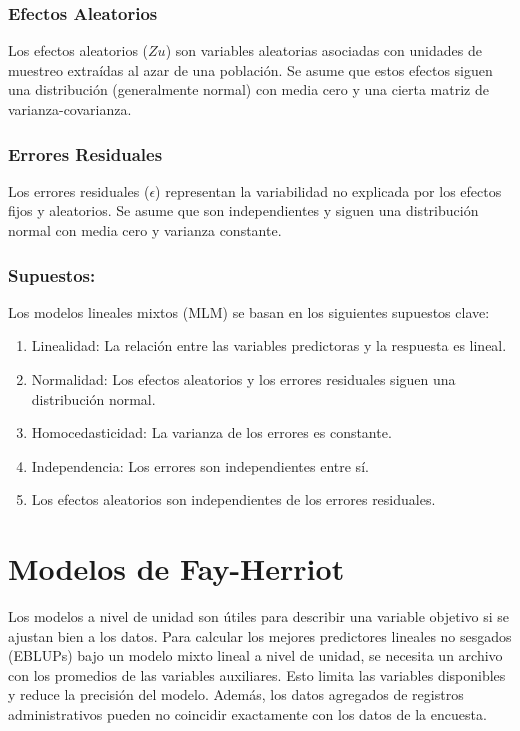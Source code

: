 \documentclass[12pt,spanish]{article}
\begin{document}
\subsubsection*{Efectos Aleatorios}

Los efectos aleatorios ($Zu$) son variables aleatorias asociadas con unidades de muestreo extraídas al azar de una población. Se asume que estos efectos siguen una distribución (generalmente normal) con media cero y una cierta matriz de varianza-covarianza.

\subsubsection*{Errores Residuales}

Los errores residuales ($\epsilon$) representan la variabilidad no explicada por los efectos fijos y aleatorios. Se asume que son independientes y siguen una distribución normal con media cero y varianza constante.

\subsubsection*{Supuestos:}

Los modelos lineales mixtos (MLM) se basan en los siguientes supuestos clave:

\begin{enumerate}
    \item Linealidad: La relación entre las variables predictoras y la respuesta es lineal.
    \item Normalidad: Los efectos aleatorios y los errores residuales siguen una distribución normal.
    \item Homocedasticidad: La varianza de los errores es constante.
    \item Independencia: Los errores son independientes entre sí.
    \item Los efectos aleatorios son independientes de los errores residuales.
\end{enumerate}

\section*{Modelos de Fay-Herriot}

Los modelos a nivel de unidad son útiles para describir una variable objetivo si se ajustan bien a los datos. Para calcular los mejores predictores lineales no sesgados (EBLUPs) bajo un modelo mixto lineal a nivel de unidad, se necesita un archivo con los promedios de las variables auxiliares. Esto limita las variables disponibles y reduce la precisión del modelo. Además, los datos agregados de registros administrativos pueden no coincidir exactamente con los datos de la encuesta.
\end{document}
